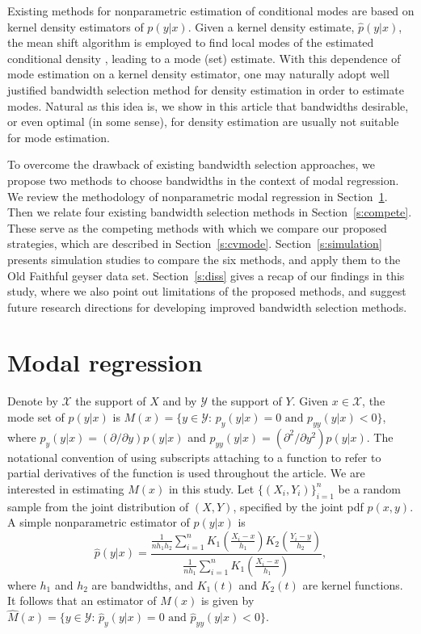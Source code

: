 \documentclass[fleqn,12pt,twoside]{article}
\numberwithin{equation}{section}
\begin{document}
Existing methods for nonparametric estimation of conditional modes are based on kernel density estimators of $p(y|x)$. Given a kernel density estimate, $\hat p(y|x)$, the mean shift algorithm is employed to find local modes of the estimated conditional density \citep{Comaniciu2002, Einbeck.Tutz2006, Chen.etal2016}, leading to a mode (set) estimate. With this dependence of mode estimation on a kernel density estimator, one may naturally adopt well justified bandwidth selection method for density estimation in order to estimate modes. Natural as this idea is, we show in this article that bandwidths desirable, or even optimal (in some sense), for density estimation are usually not suitable for mode estimation. 

To overcome the drawback of existing bandwidth selection approaches, we propose two methods to choose bandwidths in the context of modal regression. We review the methodology of nonparametric modal regression in Section~\ref{s:modalreg}. Then we relate four existing bandwidth selection methods in Section~\ref{s:compete}. These serve as the competing methods with which we compare our proposed strategies, which are described in Section~\ref{s:cvmode}. Section~\ref{s:simulation} presents simulation studies to compare the six methods, and apply them to the Old Faithful geyser data set. Section~\ref{s:diss} gives a recap of our findings in this study, where we also point out limitations of the proposed methods, and suggest future research directions for developing improved bandwidth selection methods. 

\section{Modal regression}
\label{s:modalreg}
Denote by $\mathscr{X}$ the support of $X$ and by $\mathscr{Y}$ the support of $Y$. Given $x\in \mathscr{X}$, the mode set of $p(y|x)$ is $M(x)=\{y\in \mathscr{Y}: \, p_y(y|x)=0 \textrm{ and } p_{yy}(y|x)<0\}$, where $p_y(y|x)=(\partial/\partial y)p(y|x)$ and $p_{yy}(y|x)=(\partial^2/\partial y^2) p(y|x)$. The notational convention of using subscripts attaching to a function to refer to partial derivatives of the function is used throughout the article. We are interested in estimating $M(x)$ in this study. Let $\{(X_i, Y_i)\}_{i=1}^n$ be a random sample from the joint distribution of $(X, Y)$, specified by the joint pdf $p(x,y)$. A simple nonparametric estimator of $p(y|x)$ is 
\begin{equation*}
\hat p(y|x)=\frac{\displaystyle{\frac{1}{nh_1h_2}\sum_{i=1}^n K_1\left(\frac{X_i-x}{h_1}\right)K_2\left(\frac{Y_i-y}{h_2}\right)}}{\displaystyle{\frac{1}{nh_1} \sum_{i=1}^n K_1\left(\frac{X_i-x}{h_1}\right)}},
\end{equation*}
where $h_1$ and $h_2$ are bandwidths, and $K_1(t)$ and $K_2(t)$ are kernel functions. It follows that an estimator of $M(x)$ is given by $\hat{M}(x) = \{y\in \mathscr{Y}: \, \hat{p}_y(y|x)=0 \textrm{ and } \hat{p}_{yy}(y|x)<0\}$. 
\end{document}
